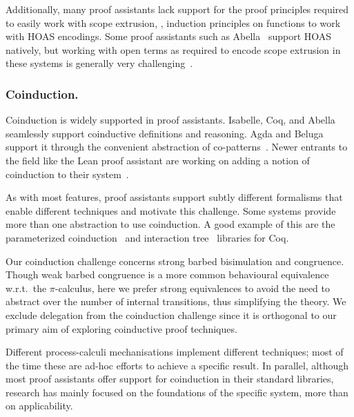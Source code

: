 \documentclass[runningheads]{llncs}
\begin{document}

Additionally, many proof assistants lack support for the proof principles required to easily work with scope extrusion, \ie, induction principles on functions to work with HOAS encodings.
Some proof assistants such as Abella~\cite{Baelde2014} support HOAS natively, but working with open terms as required to encode scope extrusion in these systems is generally very challenging~\cite{Momigliano2012}.

\subsubsection{Coinduction.}
Coinduction is widely supported in proof assistants.
Isabelle, Coq, and Abella seamlessly support coinductive definitions and reasoning.
Agda and Beluga support it through the convenient abstraction of co-patterns~\cite{Abel2013}.
Newer entrants to the field like the Lean proof assistant are working on adding a notion of coinduction to their system~\cite{Avigad2019,Keizer2023}.

As with most features, proof assistants support subtly different formalisms that enable different techniques and motivate this challenge.
Some systems provide more than one abstraction to use coinduction.
A good example of this are the parameterized coinduction~\cite{Hur2013} and interaction tree~\cite{Xia2019} libraries for Coq.


Our coinduction challenge concerns strong barbed bisimulation and
congruence.
Though weak barbed congruence is a more common behavioural equivalence
w.r.t.\ the \(\pi\)-calculus, here we prefer strong equivalences to avoid the
need to abstract over the number of internal transitions, thus
simplifying the theory.  We exclude delegation from the coinduction
challenge since it is orthogonal to our primary aim of exploring
coinductive proof techniques.

Different process-calculi
mechanisations
implement different techniques;
most of the time these 
are ad-hoc efforts to achieve a specific result.
In parallel, although most proof assistants
offer support for coinduction in their standard libraries,
research has mainly focused on the foundations
of the specific system, more than on
applicability.
\end{document}
